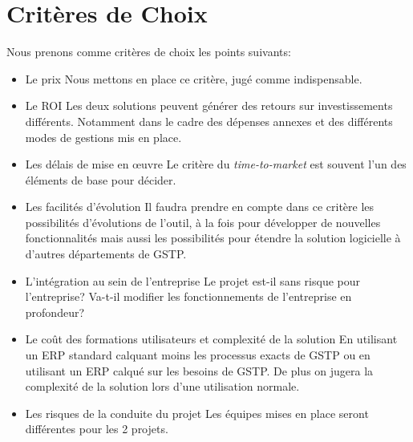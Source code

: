 \section{Critères de Choix}

Nous prenons comme critères de choix les points suivants: 

\begin{itemize}
    \item  Le prix\el
	Nous mettons en place ce critère, jugé comme indispensable.

    \item Le ROI\el
	Les deux solutions peuvent générer des retours sur investissements
différents. Notamment dans le cadre des dépenses annexes et des différents
modes de gestions mis en place.

    \item Les délais de mise en \oe{}uvre\el
	Le critère du {\sl time-to-market} est souvent l'un des éléments de
base pour décider.

    \item Les facilités d'évolution\el
	Il faudra prendre en compte dans ce critère les possibilités d'évolutions 
de l'outil, à la fois pour développer de nouvelles fonctionnalités mais aussi 
les possibilités pour étendre la solution logicielle à d'autres départements de
GSTP.

    \item L'intégration au sein de l'entreprise\el
	Le projet est-il sans risque pour l'entreprise? Va-t-il modifier les
fonctionnements de l'entreprise en profondeur?	

    \item  Le coût des formations utilisateurs et complexité de la solution\el
	En utilisant un ERP standard calquant moins les processus exacts de GSTP ou 
en utilisant un ERP calqué sur les besoins de GSTP. De plus on jugera la
complexité de la solution lors d'une utilisation normale.

    \item Les risques de la conduite du projet\el
	Les équipes mises en place seront différentes pour les 2 projets.

\end{itemize}


	
